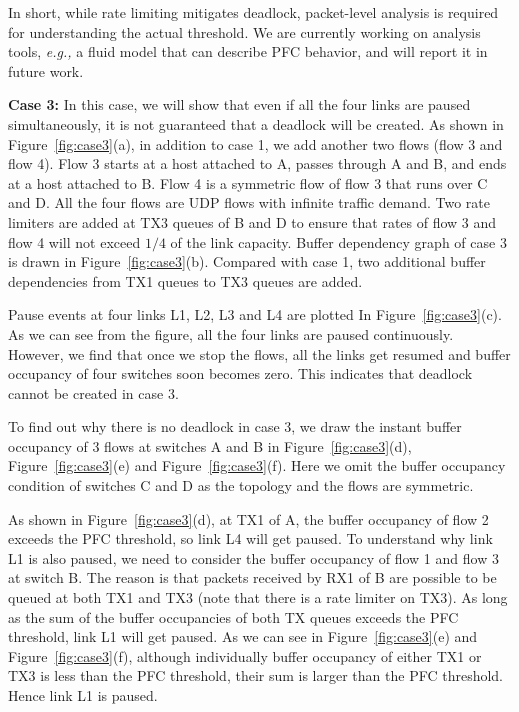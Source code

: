 In short, while rate limiting mitigates deadlock, packet-level analysis is required for understanding
the actual threshold. We are currently working on analysis tools, {\em e.g.,} a fluid model that 
can describe PFC behavior, and will report it in future work.







\textbf{Case 3:} In this case, we will show that even if all the four links are paused simultaneously, 
it is not guaranteed that a deadlock will be created. As shown in Figure~\ref{fig:case3}(a), in addition 
to case 1, we add another two flows (flow 3 and flow 4). Flow 3 starts at a host attached to A, passes 
through A and B, and ends at a host attached to B. Flow 4 is a symmetric flow of flow 3 that runs over 
C and D. All the four flows are UDP flows with infinite traffic demand. Two rate limiters are added at 
TX3 queues of B and D to ensure that rates of flow 3 and flow 4 will not exceed $1/4$ of the link 
capacity. Buffer dependency graph of case 3 is drawn in Figure~\ref{fig:case3}(b). Compared with case 1, 
two additional buffer dependencies from TX1 queues to TX3 queues are added.

Pause events at four links L1, L2, L3 and L4 are plotted In Figure~\ref{fig:case3}(c).  As we can see 
from the figure, all the four links are paused continuously. However, we find that once we stop the 
flows, all the links get resumed and buffer occupancy of four switches soon becomes zero. This 
indicates that deadlock cannot be created in case 3.

To find out why there is no deadlock in case 3, we draw the instant buffer occupancy of 3 flows at 
switches A and B in Figure~\ref{fig:case3}(d), Figure~\ref{fig:case3}(e) and Figure~\ref{fig:case3}(f). 
Here we omit the buffer occupancy condition of switches C and D as the topology and the flows are symmetric.

As shown in Figure~\ref{fig:case3}(d), at TX1 of A, the buffer occupancy of flow 2 exceeds the PFC 
threshold, so link L4 will get paused. To understand why link L1 is also paused, we need to consider 
the buffer occupancy of flow 1 and flow 3 at switch B. The reason is that packets received by RX1 of 
B are possible to be queued at both TX1 and TX3 (note that there is a rate limiter on TX3). As long 
as the sum of the buffer occupancies of both TX queues exceeds the PFC threshold, link L1 will get paused. 
As we can see in Figure~\ref{fig:case3}(e) and Figure~\ref{fig:case3}(f), although individually buffer 
occupancy of either TX1 or TX3 is less than the PFC threshold, their sum is larger than the PFC 
threshold. Hence link L1 is paused.

